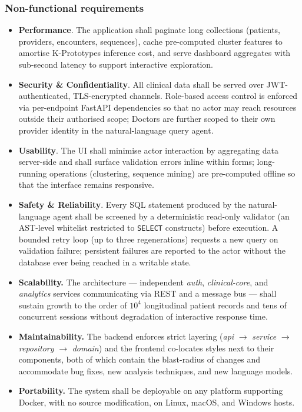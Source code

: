 \subsubsection*{Non-functional requirements}

\begin{itemize}
    \item \textbf{Performance}. The application shall paginate long collections (patients, providers, encounters, sequences), cache pre-computed cluster features to amortise K-Prototypes inference cost, and serve dashboard aggregates with sub-second latency to support interactive exploration.

    \item \textbf{Security \& Confidentiality}. All clinical data shall be served over JWT-authenticated, TLS-encrypted channels. Role-based access control is enforced via per-endpoint FastAPI dependencies so that no actor may reach resources outside their authorised scope; Doctors are further scoped to their own provider identity in the natural-language query agent.

    \item \textbf{Usability}. The UI shall minimise actor interaction by aggregating data server-side and shall surface validation errors inline within forms; long-running operations (clustering, sequence mining) are pre-computed offline so that the interface remains responsive.

    \item \textbf{Safety \& Reliability}. Every SQL statement produced by the natural-language agent shall be screened by a deterministic read-only validator (an AST-level whitelist restricted to \texttt{SELECT} constructs) before execution. A bounded retry loop (up to three regenerations) requests a new query on validation failure; persistent failures are reported to the actor without the database ever being reached in a writable state.

    \item \textbf{Scalability.} The architecture --- independent \emph{auth}, \emph{clinical-core}, and \emph{analytics} services communicating via REST and a message bus --- shall sustain growth to the order of $10^{4}$ longitudinal patient records and tens of concurrent sessions without degradation of interactive response time.

    \item \textbf{Maintainability.} The backend enforces strict layering (\emph{api} $\to$ \emph{service} $\to$ \emph{repository} $\to$ \emph{domain}) and the frontend co-locates styles next to their components, both of which contain the blast-radius of changes and accommodate bug fixes, new analysis techniques, and new language models.

    \item \textbf{Portability.} The system shall be deployable on any platform supporting Docker, with no source modification, on Linux, macOS, and Windows hosts.
\end{itemize}

